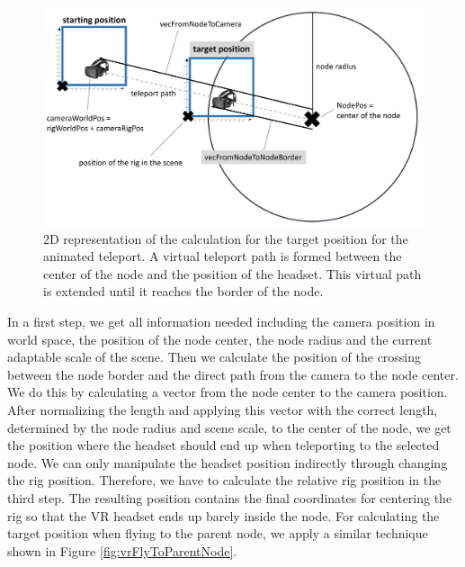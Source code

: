 \begin{figure}[h]
    \centering
    \includegraphics[width=1\textwidth]{graphics/flyToNodePositionCalc.jpg}
    \caption[2D representation of the calculation for the target position for the animated teleport.]{2D representation of the calculation for the target position for the animated teleport. A virtual teleport path is formed between the center of the node and the position of the headset. This virtual path is extended until it reaches the border of the node.} 
    \label{fig:vrFlyToNode} 
\end{figure}

In a first step, we get all information needed including the camera position in world space, the position of the node center, the node radius and the current adaptable scale of the scene.
Then we calculate the position of the crossing between the node border and the direct path from the camera to the node center. We do this by calculating a vector from the node center to the camera position. After normalizing the length and applying this vector with the correct length, determined by the node radius and scene scale, to the center of the node, we get the position where the headset should end up when teleporting to the selected node.
We can only manipulate the headset position indirectly through changing the rig position. Therefore, we have to calculate the relative rig position in the third step. 
The resulting position contains the final coordinates for centering the rig so that the VR headset ends up barely inside the node.
For calculating the target position when flying to the parent node, we apply a similar technique shown in Figure \ref{fig:vrFlyToParentNode}.

